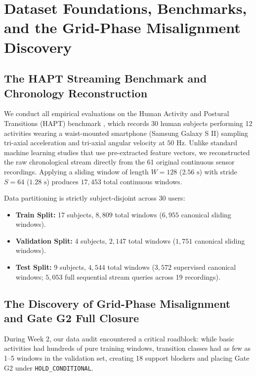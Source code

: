 \documentclass[journal,onecolumn,10pt]{IEEEtran}
\newcommand{\code}[1]{{\small\ttfamily\nolinkurl{#1}}}
\theoremstyle{remark}
\begin{document}
\section{Dataset Foundations, Benchmarks, and the Grid-Phase Misalignment Discovery}

\subsection{The HAPT Streaming Benchmark and Chronology Reconstruction}
We conduct all empirical evaluations on the Human Activity and Postural Transitions (HAPT) benchmark \cite{reyesortiz2015hapt}, which records 30 human subjects performing 12 activities wearing a waist-mounted smartphone (Samsung Galaxy S II) sampling tri-axial acceleration and tri-axial angular velocity at $50\text{ Hz}$.
Unlike standard machine learning studies that use pre-extracted feature vectors, we reconstructed the raw chronological stream directly from the 61 original continuous sensor recordings. Applying a sliding window of length $W = 128$ ($2.56\text{ s}$) with stride $S = 64$ ($1.28\text{ s}$) produces $17,453$ total continuous windows.

Data partitioning is strictly subject-disjoint across 30 users:
\begin{itemize}[leftmargin=1.4em]
  \item \textbf{Train Split:} 17 subjects, $8,809$ total windows ($6,955$ canonical sliding windows).
  \item \textbf{Validation Split:} 4 subjects, $2,147$ total windows ($1,751$ canonical sliding windows).
  \item \textbf{Test Split:} 9 subjects, $4,544$ total windows ($3,572$ supervised canonical windows; $5,053$ full sequential stream queries across 19 recordings).
\end{itemize}

\subsection{The Discovery of Grid-Phase Misalignment and Gate G2 Full Closure}
During Week 2, our data audit encountered a critical roadblock: while basic activities had hundreds of pure training windows, transition classes had as few as 1--5 windows in the validation set, creating 18 support blockers and placing Gate G2 under \code{HOLD_CONDITIONAL}.
\end{document}
